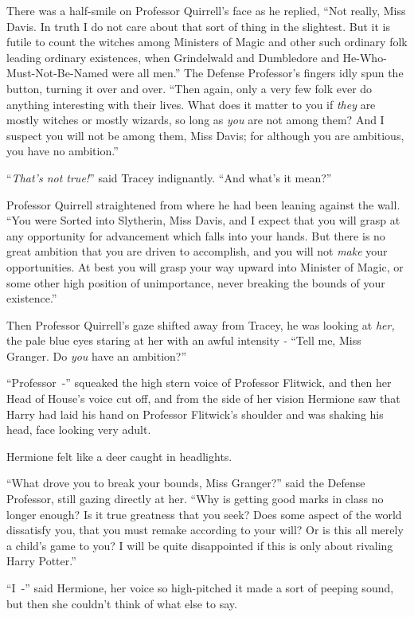 There was a half-smile on Professor Quirrell's face as he replied, ``Not really, Miss Davis. In truth I do not care about that sort of thing in the slightest. But it is futile to count the witches among Ministers of Magic and other such ordinary folk leading ordinary existences, when Grindelwald and Dumbledore and He-Who-Must-Not-Be-Named were all men.'' The Defense Professor's fingers idly spun the button, turning it over and over. ``Then again, only a very few folk ever do anything interesting with their lives. What does it matter to you if \emph{they} are mostly witches or mostly wizards, so long as \emph{you} are not among them? And I suspect you will not be among them, Miss Davis; for although you are ambitious, you have no ambition.''

``\emph{That's not true!}'' said Tracey indignantly. ``And what's it mean?''

Professor Quirrell straightened from where he had been leaning against the wall. ``You were Sorted into Slytherin, Miss Davis, and I expect that you will grasp at any opportunity for advancement which falls into your hands. But there is no great ambition that you are driven to accomplish, and you will not \emph{make} your opportunities. At best you will grasp your way upward into Minister of Magic, or some other high position of unimportance, never breaking the bounds of your existence.''

Then Professor Quirrell's gaze shifted away from Tracey, he was looking at \emph{her,} the pale blue eyes staring at her with an awful intensity \emph{-} ``Tell me, Miss Granger. Do \emph{you} have an ambition?''

``Professor~-'' squeaked the high stern voice of Professor Flitwick, and then her Head of House's voice cut off, and from the side of her vision Hermione saw that Harry had laid his hand on Professor Flitwick's shoulder and was shaking his head, face looking very adult.

Hermione felt like a deer caught in headlights.

``What drove you to break your bounds, Miss Granger?'' said the Defense Professor, still gazing directly at her. ``Why is getting good marks in class no longer enough? Is it true greatness that you seek? Does some aspect of the world dissatisfy you, that you must remake according to your will? Or is this all merely a child's game to you? I will be quite disappointed if this is only about rivaling Harry Potter.''

``I~-'' said Hermione, her voice so high-pitched it made a sort of peeping sound, but then she couldn't think of what else to say.

